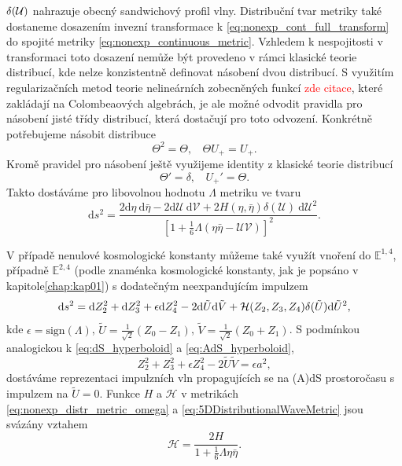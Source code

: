 $\delta(\mathcal{U})$ nahrazuje obecný sandwichový profil vlny.
Distribuční tvar metriky také dostaneme dosazením invezní transformace k \eqref{eq:nonexp_cont_full_transform} do spojité metriky 
\eqref{eq:nonexp_continuous_metric}. Vzhledem k nespojitosti v transformaci toto dosazení nemůže být provedeno
v rámci klasické teorie distribucí, kde nelze konzistentně definovat násobení dvou distribucí. S využitím regularizačních metod teorie
nelineárních zobecněných funkcí \textcolor{red}{zde citace}, které zakládají na Colombeaových algebrách, je ale možné odvodit pravidla pro násobení
jisté třídy distribucí, která dostačují pro toto odvození. Konkrétně potřebujeme násobit distribuce
\begin{equation}
        \Theta^2 = \Theta, ~~~~ \Theta U_{+} = U_{+}.
\end{equation}
Kromě pravidel pro násobení ještě využijeme identity z klasické teorie distribucí
\begin{equation}
    \Theta' = \delta, ~~~~ U_{+}' = \Theta.
\end{equation}
Takto dostáváme pro libovolnou hodnotu $\Lambda$ metriku ve tvaru
\begin{equation} \label{eq:nonexp_distr_metric_omega}
\mathrm{d}s^2=\frac{2\mathrm{d}\eta~\mathrm{d}\bar{\eta} - 2 \mathrm{d}\mathcal{U}~\mathrm{d}\mathcal{V} + 2H(\eta, \bar{\eta}) \delta(\mathcal{U}) 
~\mathrm{d}\mathcal{U}^2}{\left[1+\frac{1}{6}\Lambda(\eta \bar{\eta}-\mathcal{U}\mathcal{V})\right]^2}.
\end{equation}

V případě nenulové kosmologické konstanty můžeme také využít vnoření do $\mathbb{E}^{1,4}$, případně $\mathbb{E}^{2,4}$ (podle znaménka kosmologické
konstanty, jak je popsáno v kapitole\autoref{chap:kap01}) s dodatečným neexpandujícím impulzem
\begin{equation}
    \label{eq:5DDistributionalWaveMetric}
    \mathrm{d} s^2 = \mathrm{d} Z_2^2 + \mathrm{d} Z_3^2 + \epsilon \mathrm{d} Z_4^2 - 2 \mathrm{d} \tilde{U} \mathrm{d} \tilde{V} + \mathcal{H}(Z_2, Z_3, Z_4) \delta(\tilde{U}) \mathrm{d} \tilde{U}^2,
\end{equation}
kde $\epsilon = \text{sign} (\Lambda)$, $\tilde{U} = \tfrac{1}{\sqrt{2}}(Z_0 - Z_1)$, $\tilde{V}= \tfrac{1}{\sqrt{2}}(Z_0 + Z_1)$.
S podmínkou analogickou k \eqref{eq:dS_hyperboloid} a \eqref{eq:AdS_hyperboloid},
\begin{equation}
    Z_2^2 + Z_3^2 + \epsilon Z_4^2 - 2 \tilde{U} \tilde{V} = \epsilon a^2,
\end{equation}
dostáváme reprezentaci impulzních vln propagujících se na (A)dS prostoročasu s impulzem na $\tilde{U}=0$. 
Funkce $H$ a $\mathcal{H}$ v metrikách \eqref{eq:nonexp_distr_metric_omega} a \eqref{eq:5DDistributionalWaveMetric} jsou svázány vztahem
\begin{equation}
    \mathcal{H} = \frac{2H}{1+\frac{1}{6}\Lambda \eta \bar{\eta}}.
\end{equation}


